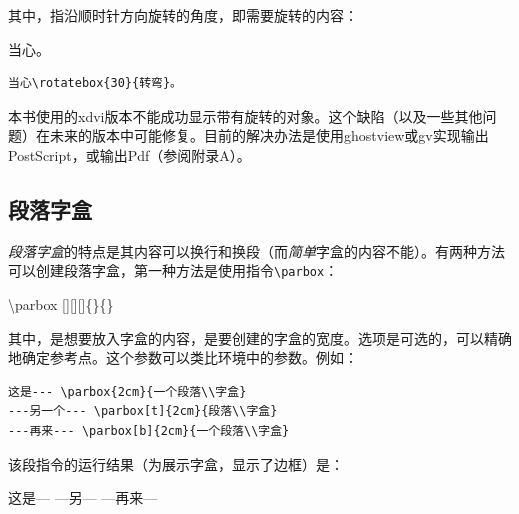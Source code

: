 其中，指沿顺时针方向旋转的角度，即需要旋转的内容：

\begin{codelist}[4.15]{
  当心。
}
\begin{verbatim}
当心\rotatebox{30}{转弯}。\end{verbatim}
\end{codelist}

\begin{ii}
本书使用的xdvi版本不能成功显示带有旋转的对象。这个缺陷（以及一些其他问题）在未来的版本中可能修复。目前的解决办法是使用ghostview或gv实现输出PostScript，或输出Pdf（参阅附录A）。%
\end{ii}

\subsection{段落字盒}

\emph{段落字盒}的特点是其内容可以换行和换段（而\emph{简单}字盒的内容不能）。有两种方法可以创建段落字盒，第一种方法是使用指令\verb|\parbox|：

\begin{dmd}
\backslash parbox [][][]\{\}\{\}
\end{dmd}

其中，是想要放入字盒的内容，是要创建的字盒的宽度。选项是可选的，可以精确地确定参考点。这个参数可以类比环境中的参数。例如：

\begin{dmd}
  \begin{verbatim}
这是--- \parbox{2cm}{一个段落\\字盒}
---另一个--- \parbox[t]{2cm}{段落\\字盒}
---再来--- \parbox[b]{2cm}{一个段落\\字盒}
  \end{verbatim}
\end{dmd}

该段指令的运行结果（为展示字盒，显示了边框）是：

这是--- 
---另--- 
---再来--- 

